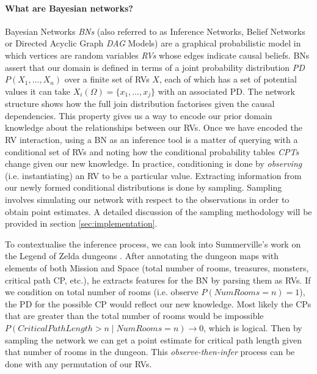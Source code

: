\documentclass{UoYCSproject}
\begin{document}
\paragraph{What are Bayesian networks?}
Bayesian Networks \textit{BNs} \parencite{pearl1985bayesian} (also referred to as Inference Networks, Belief Networks or Directed Acyclic Graph \textit{DAG} Models) are a graphical probabilistic model in which vertices are random variables \textit{RVs} whose edges indicate causal beliefs. BNs assert that our domain is defined in terms of a joint probability distribution \textit{PD} \(P(X_1, \ldots , X_n)\) over a finite set of RVs \(X\), each of which has a set of potential values it can take \(X_i(\Omega) = \{x_1, \ldots, x_j\}\) with an associated PD. The network structure shows how the full join distribution factorises given the causal dependencies. This property gives us a way to encode our prior domain knowledge about the relationships between our RVs.
Once we have encoded the RV interaction, using a BN as an inference tool is a matter of querying with a conditional set of RVs and noting how the conditional probability tables \textit{CPTs} change given our new knowledge. In practice, conditioning is done by \textit{observing} (i.e. instantiating) an RV to be a particular value. Extracting information from our newly formed conditional distributions is done by sampling. Sampling involves simulating our network with respect to the observations in order to obtain point estimates. A detailed discussion of the sampling methodology will be provided in section \ref{sec:implementation}.

To contextualise the inference process, we can look into Summerville's work on the Legend of Zelda dungeons \parencite{SummervilleLearningOfZelda}. After annotating the dungeon maps with elements of both Mission and Space (total number of rooms, treasures, monsters, critical path CP, etc.), he extracts features for the BN by parsing them as RVs. If we condition on total number of rooms (i.e. observe \(P(NumRooms = n) = 1\)), the PD for the possible CP would reflect our new knowledge. Most likely the CPs that are greater than the total number of rooms would be impossible \(P(CriticalPathLength > n \mid NumRooms = n) \rightarrow 0 \), which is logical. Then by sampling the network we can get a point estimate for critical path length given that number of rooms in the dungeon. This \textit{observe-then-infer} process can be done with any permutation of our RVs.
\end{document}
